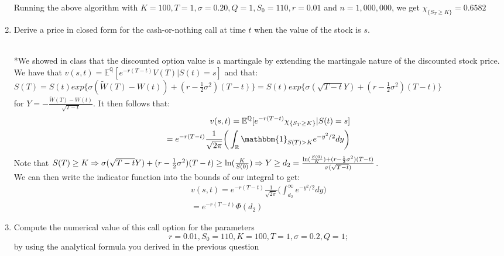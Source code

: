 \documentclass[12pt,twoside, letter]{exam}
\theoremstyle{definition}
\newcommand{\rr}{\mathbb{R}}
\newcommand{\ee}{\mathbb{E}}
\newcommand{\id}{\mathbbm{1}}
\begin{document}
\begin{enumerate}
      \begin{solution}
        Running the above algorithm with $K = 100, T = 1, \sigma = 0.20, Q = 1, S_0 = 110, r = 0.01$ and
        $n = 1,000,000$, we get $\chi_{\{S_T \geq K\}} = 0.6582$
      \end{solution}
    \item Derive a price in closed form for the cash-or-nothing call at time $t$ when the value of the stock is $s$.
      \begin{solution}\\
        *We showed in class that the discounted option value is a martingale by extending the martingale nature of the discounted stock price.  \\
        We have that $v(s,t) = \ee^{\mathbb{Q}}[e^{-r(T-t)}V(T) | S(t) = s]$ and that: \\
        $S(T) = S(t)exp\{\sigma(\tilde{W}(T) - W(t)) + (r- \frac{1}{2}\sigma^2)(T-t)\}
        = S(t)exp\{\sigma(\sqrt{T-t}Y) + (r- \frac{1}{2}\sigma^2)(T-t)\}$ \\
        for $Y = -\frac{\tilde{W}(T)-W(t)}{\sqrt{T-t}}$.
        It then follows that:
        \begin{align*}
          v(s,t) = \ee^{\mathbb{Q}}[e^{-r(T-t)}\chi_{\{S_T \geq K \}} | S(t) = s] \\
          = e^{-r(T-t)}\frac{1}{\sqrt{2\pi}}\bigg(\int_{\rr} \id_{S(T) > K} e^{-y^2/2} dy \bigg)
        \end{align*}
        Note that $S(T) \geq K \Rightarrow \sigma(\sqrt{T-t}Y) + (r- \frac{1}{2}\sigma^2)(T-t) \geq \ln(\frac{K}{S(0)}) \\
        \Rightarrow Y \geq d_2 = \frac{\ln(\frac{S(0)}{K}) + (r- \frac{1}{2}\sigma^2)(T-t)}{\sigma(\sqrt{T-t})}$. \\
        We can then write the indicator function into the bounds of our integral to get:
        \begin{align*}
          v(s,t) = e^{-r(T-t)}\frac{1}{\sqrt{2\pi}}\bigg(\int^{\infty}_{d_2} e^{-y^2/2} dy \bigg) \\
          = e^{-r(T-t)}\Phi(d_2)
        \end{align*}
      \end{solution}
    \item Compute the numerical value of this call option for the parameters
      \begin{equation*}
        r = 0.01, S_0 = 110, K = 100, T = 1, \sigma = 0.2, Q = 1;
      \end{equation*}
      by using the analytical formula you derived in the previous question

\end{enumerate}
\end{document}
